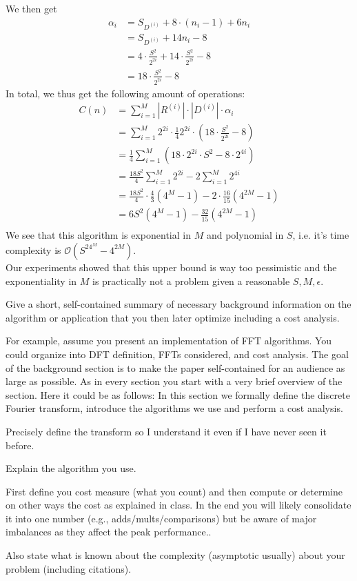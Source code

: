 We then get 
\begin{align*}
\alpha_i    &= S_{D^{(i)}} + 8 \cdot (n_i-1) + 6n_i \\
            &= S_{D^{(i)}} + 14n_i - 8 \\
            &= 4 \cdot \frac{S^2}{2^{2i}} + 14 \cdot \frac{S^2}{2^{2i}} - 8 \\
            &= 18 \cdot \frac{S^2}{2^{2i}} - 8
\end{align*}
In total, we thus get the following amount of operations:
\begin{align*}
C(n)    &= \sum_{i=1}^M |R^{(i)}| \cdot |D^{(i)}| \cdot \alpha_i \\
        &= \sum_{i=1}^M 2^{2i} \cdot \frac{1}{4} 2^{2i} \cdot (18 \cdot \frac{S^2}{2^{2i}} - 8) \\
        &= \frac{1}{4} \sum_{i=1}^M \left(18 \cdot 2^{2i} \cdot S^2 - 8 \cdot 2^{4i} \right) \\
        &= \frac{18S^2}{4} \sum_{i=1}^M 2^{2i} - 2 \sum_{i=1}^M 2^{4i} \\
        &= \frac{18S^2}{4} \cdot \frac{4}{3}(4^M-1) - 2 \cdot \frac{16}{15}(4^{2M} - 1) \\
        &= 6S^2(4^M-1) - \frac{32}{15}(4^{2M}-1) \\
\end{align*}
We see that this algorithm is exponential in $M$ and polynomial in $S$, i.e. it's time complexity is $\mathcal{O}(S^24^{M} - 4^{2M})$.\\
Our experiments showed that this upper bound is way too pessimistic and the exponentiality in $M$ is practically not a problem given a reasonable $S,M,\epsilon$.

Give a short, self-contained summary of necessary
background information on the algorithm or application that you then later optimize including a cost analysis.

For example, assume you present an
implementation of FFT algorithms. You could organize into DFT
definition, FFTs considered, and cost analysis. The goal of the
background section is to make the paper self-contained for an audience
as large as possible. As in every section
you start with a very brief overview of the section. Here it could be as follows: In this section
we formally define the discrete Fourier transform, introduce the algorithms we use
and perform a cost analysis.

Precisely define the transform so I understand it even if I have never
seen it before.

Explain the algorithm you use.

First define you cost measure (what you count) and then compute or determine on other ways the
cost as explained in class. In the end you will likely consolidate it into one number (e.g., adds/mults/comparisons) but be aware of major imbalances as they affect the peak performance..

Also state what is known about the complexity (asymptotic usually)
about your problem (including citations).